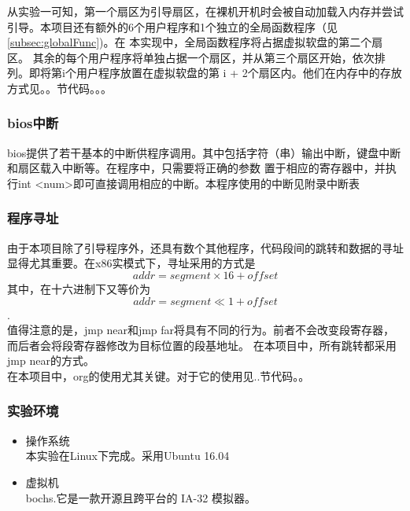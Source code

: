 \documentclass[a4paper]{article}
\newcommand{\codev}[1]{\textsf{#1}}
\begin{document}
    从实验一可知，第一个扇区为引导扇区，在裸机开机时会被自动加载入内存并尝试引导。本项目还有额外的6个用户程序和1个独立的全局函数程序（见
    \ref{subsec:globalFunc})。在
    本实现中，全局函数程序将占据虚拟软盘的第二个扇区。
    其余的每个用户程序将单独占据一个扇区，并从第三个扇区开始，依次排列。即将第\codev{i}个用户程序放置在虚拟软盘的第
    \codev{i + 2}个扇区内。他们在内存中的存放方式见。。节代码。。。%
    \\
    
    \subsubsection{bios中断}
    bios提供了若干基本的中断供程序调用。其中包括字符（串）输出中断，键盘中断和扇区载入中断等。在程序中，只需要将正确的参数
    置于相应的寄存器中，并执行\codev{int <num>}即可直接调用相应的中断。本程序使用的中断见附录中断表%
    \\
    \subsubsection{程序寻址}
    由于本项目除了引导程序外，还具有数个其他程序，代码段间的跳转和数据的寻址显得尤其重要。在x86实模式下，寻址采用的方式是
    $$ addr = segment \times 16 + offset $$
    其中，在十六进制下又等价为 $$addr = segment \ll 1 + offset$$.
    \\
    
    值得注意的是，\codev{jmp near}和\codev{jmp far}将具有不同的行为。前者不会改变段寄存器，而后者会将段寄存器修改为目标位置的段基地址。
    在本项目中，所有跳转都采用\codev{jmp near}的方式。 \\
    
    在本项目中，\codev{org}的使用尤其关键。对于它的使用见..节代码。。%
    \subsubsection{实验环境}
        \begin{itemize} \item 操作系统 \\ 
            本实验在Linux下完成。采用Ubuntu 16.04
            \item 虚拟机\\
            bochs.它是一款开源且跨平台的 IA-32 模拟器。
        \end{itemize}
\end{document}
